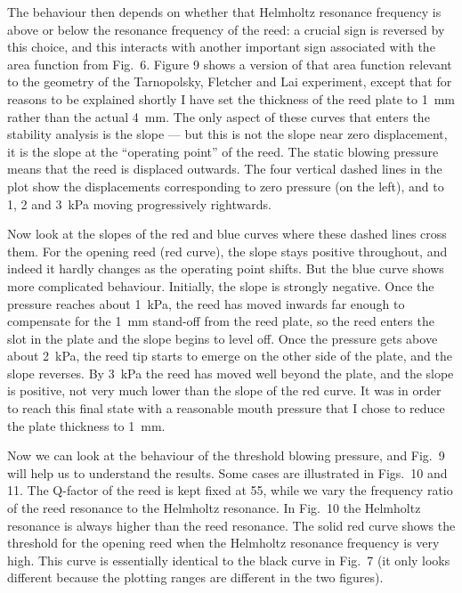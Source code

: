   The behaviour then depends on whether that Helmholtz resonance frequency is 
  above or below the resonance frequency of the reed: a crucial sign is 
  reversed by this choice, and this interacts with another important sign 
  associated with the area function from Fig.\ 6. Figure 9 shows a version of 
  that area function relevant to the geometry of the Tarnopolsky, Fletcher and 
  Lai experiment, except that for reasons to be explained shortly I have set 
  the thickness of the reed plate to 1~mm rather than the actual 4~mm. The only 
  aspect of these curves that enters the stability analysis is the slope — but 
  this is not the slope near zero displacement, it is the slope at the 
  “operating point” of the reed. The static blowing pressure means that the 
  reed is displaced outwards. The four vertical dashed lines in the plot show 
  the displacements corresponding to zero pressure (on the left), and to 1, 2 
  and 3~kPa moving progressively rightwards. 

  Now look at the slopes of the red and blue curves where these dashed lines 
  cross them. For the opening reed (red curve), the slope stays positive 
  throughout, and indeed it hardly changes as the operating point shifts. But 
  the blue curve shows more complicated behaviour. Initially, the slope is 
  strongly negative. Once the pressure reaches about 1~kPa, the reed has moved 
  inwards far enough to compensate for the 1~mm stand-off from the reed plate, 
  so the reed enters the slot in the plate and the slope begins to level off. 
  Once the pressure gets above about 2~kPa, the reed tip starts to emerge on 
  the other side of the plate, and the slope reverses. By 3~kPa the reed has 
  moved well beyond the plate, and the slope is positive, not very much lower 
  than the slope of the red curve. It was in order to reach this final state 
  with a reasonable mouth pressure that I chose to reduce the plate thickness 
  to 1~mm. 

  Now we can look at the behaviour of the threshold blowing pressure, and Fig.\ 
  9 will help us to understand the results. Some cases are illustrated in 
  Figs.\ 10 and 11. The Q-factor of the reed is kept fixed at 55, while we vary 
  the frequency ratio of the reed resonance to the Helmholtz resonance. In 
  Fig.\ 10 the Helmholtz resonance is always higher than the reed resonance. 
  The solid red curve shows the threshold for the opening reed when the 
  Helmholtz resonance frequency is very high. This curve is essentially 
  identical to the black curve in Fig.\ 7 (it only looks different because the 
  plotting ranges are different in the two figures). 

